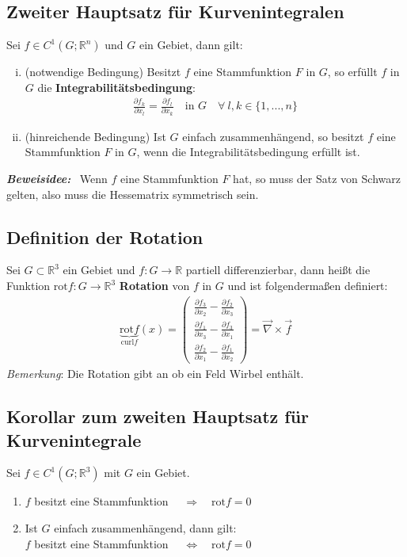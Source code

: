 \documentclass[11pt,a4paper]{book}
\newcommand {\R}	{\mathbb{R}}
\newcommand {\Rn}	{\mathbb{R}^n}
\newcommand{\1}    	{\mathbbm{1}}
\newcommand{\Beweis}[1][Beweis]
{\begin{mdframed}[backgroundcolor=gray!10,linewidth=0pt]\noindent\textit{\textbf{{#1}:}}~}
\newcommand{\QED}	{\end{mdframed}}
\newcommand{\Bemerkung}	{\noindent\textit{Bemerkung}: }
\begin{document}
\subsection{Zweiter Hauptsatz für Kurvenintegralen}
Sei \(f \in C^1(G;\Rn)\) und \(G\) ein Gebiet, dann gilt:
\begin{enumerate}[(i)]
	\item (notwendige Bedingung) Besitzt \(f\) eine Stammfunktion \(F\) in \(G\), so erfüllt \(f\) in \(G\) die \textbf{Integrabilitätsbedingung}:
	\begin{align*}
		\frac{\partial f_k}{\partial x_l} = \frac{\partial f_l}{\partial x_k} \quad \textrm{in } G \quad \forall~ l,k \in \{1, ..., n\}
	\end{align*}
	\item (hinreichende Bedingung) Ist \(G\) einfach zusammenhängend, so besitzt \(f\) eine Stammfunktion \(F\) in \(G\), wenn die Integrabilitätsbedingung erfüllt ist.
\end{enumerate}
\Beweis[Beweisidee]
Wenn \(f\) eine Stammfunktion \(F\) hat, so muss der Satz von Schwarz gelten, also muss die Hessematrix symmetrisch sein.
\QED

\subsection{Definition der Rotation}
Sei \(G \subset \R^3\) ein Gebiet und \(f: G \rightarrow \R\) partiell differenzierbar, dann heißt die Funktion \(\textrm{rot} f : G \rightarrow \R^3 \) \textbf{Rotation} von \(f\) in \(G\) und ist folgendermaßen definiert: 
\begin{align*}
	\underbrace{\textrm{rot} f}_{\textrm{curl} f}(x) = 
	\left( \begin{array}{c}
		\frac{\partial f_3}{\partial x_2} - \frac{\partial f_2}{\partial x_3} \\
		\frac{\partial f_1}{\partial x_3} - \frac{\partial f_3}{\partial x_1} \\
		\frac{\partial f_2}{\partial x_1} - \frac{\partial f_1}{\partial x_2}
	\end{array} \right) = \vec{\nabla} \times \vec{f}
\end{align*}
\Bemerkung Die Rotation gibt an ob ein Feld Wirbel enthält.

\subsection{Korollar zum zweiten Hauptsatz für Kurvenintegrale}
Sei \(f \in C^1(G;\R^3)\) mit \(G\) ein Gebiet.
\begin{enumerate}
	\item \(f\) besitzt eine Stammfunktion \(\quad\Rightarrow\quad \textrm{rot} f = 0\) 
	\item Ist \(G\) einfach zusammenhängend, dann gilt:\\
	\(f\) besitzt eine Stammfunktion \(\quad\Leftrightarrow\quad \textrm{rot} f = 0\)
\end{enumerate}
\end{document}
